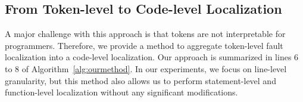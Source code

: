%

\subsection{From Token-level to Code-level Localization}
A major challenge with this approach is that tokens are not interpretable for programmers. Therefore, we provide a method to aggregate token-level fault localization into a code-level localization. Our approach is summarized in lines 6 to 8 of Algorithm~\ref{alg:ourmethod}. In our experiments, we focus on line-level granularity, but this method also allows us to perform statement-level and function-level localization without any significant modifications.

